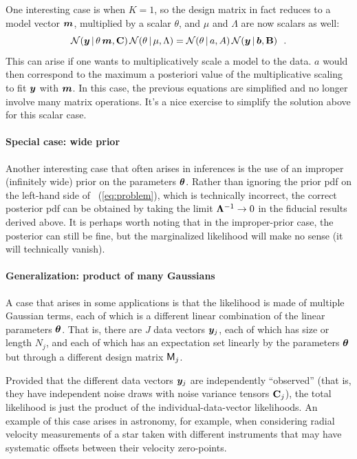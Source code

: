 One interesting case is when $K=1$, so the design matrix in fact
reduces to a model vector $\boldsymbol{m}$, multiplied by a scalar $\theta$, and
$\mu$ and $\Lambda$ are now scalars as well:
\begin{equation}
\mathcal{N}\!\,(\boldsymbol{y}\,|\,\theta\,\boldsymbol{m},\mathbf{C})\,\mathcal{N}\!\,(\theta\,|\,\mu,\Lambda) = \mathcal{N}\!\,(\theta\,|\, a,A)\,\mathcal{N}\!\,(\boldsymbol{y}\,|\,\boldsymbol{b},\mathbf{B})
~~.
\end{equation}
This can arise if one wants to multiplicatively scale a model to the data. $a$ would then correspond to the maximum a posteriori value of the multiplicative scaling to fit $\boldsymbol{y}$ with $\boldsymbol{m}$.
In this case, the previous equations are simplified and no longer
involve many matrix operations. It's a nice exercise to simplify the
solution above for this scalar case.

\paragraph{Special case: wide prior}
Another interesting case that often arises in inferences is the use of an improper
(infinitely wide) prior on the parameters $\boldsymbol{\theta}$. Rather than
ignoring the prior pdf on the left-hand side of
\equationname~(\ref{eq:problem}), which is technically incorrect, the correct
posterior pdf can be obtained by taking the limit $\mathbf{\Lambda}^{-1} \rightarrow 0$ in the
fiducial results derived above. It is perhaps
worth noting that in the improper-prior case,
the posterior can still be fine, but the marginalized likelihood will make no sense (it will technically vanish).


\paragraph{Generalization: product of many Gaussians}

A case that arises in some applications is that the
likelihood is made of multiple Gaussian terms, each of which is a
different linear combination of the linear parameters $\boldsymbol{\theta}$.
That is, there are $J$ data vectors $\boldsymbol{y}_j$, each of which has size or length $N_j$,
and each of which has an expectation
set linearly by the parameters $\boldsymbol{\theta}$ but through a different design matrix $\mathsf{M}_j$.

Provided that the different data vectors $\boldsymbol{y}_j$ are independently ``observed'' (that
is, they have independent noise draws with noise variance tensors $\mathbf{C}_j$),
the total likelihood is just the product of
the individual-data-vector likelihoods.
An example of this case arises in astronomy, for example, when considering
radial velocity measurements of a star taken with different instruments that may
have systematic offsets between their velocity zero-points.

